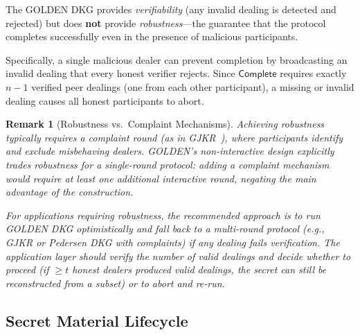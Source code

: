 \documentclass[11pt,a4paper]{article}
\newtheorem{remark}{Remark}[section]
\begin{document}
The GOLDEN DKG provides \emph{verifiability} (any invalid dealing is detected
and rejected) but does \textbf{not} provide \emph{robustness}---the guarantee
that the protocol completes successfully even in the presence of malicious
participants.

Specifically, a single malicious dealer can prevent completion by broadcasting
an invalid dealing that every honest verifier rejects. Since
$\mathsf{Complete}$ requires exactly $n - 1$ verified peer dealings
(one from each other participant), a missing or invalid dealing causes all
honest participants to abort.

\begin{remark}[Robustness vs.\ Complaint Mechanisms]
  Achieving robustness typically requires a \emph{complaint round}
  (as in GJKR~\cite{gjkr1999}), where participants identify and exclude
  misbehaving dealers. GOLDEN's non-interactive design explicitly trades
  robustness for a single-round protocol: adding a complaint mechanism would
  require at least one additional interactive round, negating the main
  advantage of the construction.

  For applications requiring robustness, the recommended approach is to run
  GOLDEN DKG optimistically and fall back to a multi-round protocol (e.g.,
  GJKR or Pedersen DKG with complaints) if any dealing fails verification.
  The application layer should verify the number of valid dealings and decide
  whether to proceed (if $\ge t$ honest dealers produced valid dealings, the
  secret can still be reconstructed from a subset) or to abort and re-run.
\end{remark}

\subsection{Secret Material Lifecycle}
\label{sec:secret-lifecycle}
\end{document}
